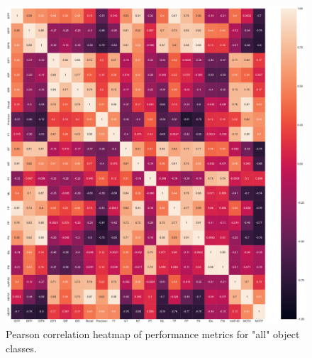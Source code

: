 \begin{figure}[!htbp]
  \centering
  \includegraphics[width=1.0\linewidth]{img/correlation.pdf}
  \caption[Pearson correlation heatmap of performance metrics for "all" object classes]
  {
  Pearson correlation heatmap of performance metrics for "all" object classes.
  }
  \label{fig:correlation}
\end{figure}